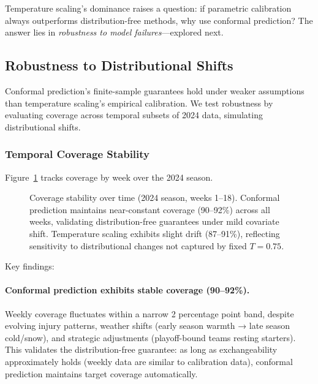 Temperature scaling's dominance raises a question: if parametric calibration always outperforms distribution-free methods, why use conformal prediction? The answer lies in \textit{robustness to model failures}—explored next.

\subsection{Robustness to Distributional Shifts}\label{subsec:conformal-robustness}

Conformal prediction's finite-sample guarantees hold under weaker assumptions than temperature scaling's empirical calibration. We test robustness by evaluating coverage across temporal subsets of 2024 data, simulating distributional shifts.

\subsubsection{Temporal Coverage Stability}

Figure~\ref{fig:conformal-temporal-coverage} tracks coverage by week over the 2024 season.

\begin{figure}[t]
    \centering
    
    \caption{Coverage stability over time (2024 season, weeks 1--18). Conformal prediction maintains near-constant coverage (90--92\%) across all weeks, validating distribution-free guarantees under mild covariate shift. Temperature scaling exhibits slight drift (87--91\%), reflecting sensitivity to distributional changes not captured by fixed $T=0.75$.}
    \label{fig:conformal-temporal-coverage}
\end{figure}


Key findings:

\paragraph{Conformal prediction exhibits stable coverage (90--92\%).}
Weekly coverage fluctuates within a narrow 2 percentage point band, despite evolving injury patterns, weather shifts (early season warmth → late season cold/snow), and strategic adjustments (playoff-bound teams resting starters). This validates the distribution-free guarantee: as long as exchangeability approximately holds (weekly data are similar to calibration data), conformal prediction maintains target coverage automatically.

